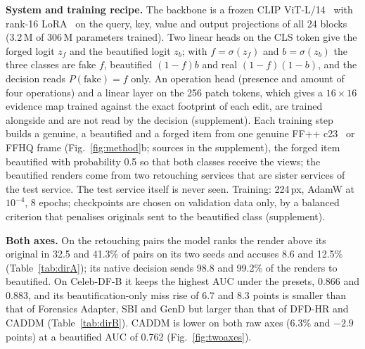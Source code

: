 \documentclass[journal]{IEEEtran}  %
\begin{document}
\textbf{System and training recipe.} The backbone is a frozen CLIP ViT-L/14~\cite{clip} with rank-16 LoRA~\cite{lora} on the
query, key, value and output projections of all 24 blocks (3.2\,M of 306\,M parameters trained). Two linear heads on the CLS
token give the forged logit $z_f$ and the beautified logit $z_b$; with $f=\sigma(z_f)$ and $b=\sigma(z_b)$ the three classes
are fake $f$, beautified $(1-f)b$ and real $(1-f)(1-b)$, and the decision reads $P(\text{fake})=f$ only. An operation head
(presence and amount of four operations) and a linear layer on the 256 patch tokens, which gives a $16\times16$ evidence map
trained against the exact footprint of each edit, are trained alongside and are not read by the decision (supplement).
Each training step builds a genuine, a beautified and a forged item from one genuine FF++ c23~\cite{ffpp} or FFHQ frame
(Fig.~\ref{fig:method}b; sources in the supplement), the forged item beautified with probability 0.5 so that both classes
receive the views; the beautified renders come from two retouching services that are sister services of the test service.
The test service itself is never seen. Training: 224\,px, AdamW at $10^{-4}$, 8 epochs; checkpoints are chosen on validation
data only, by a balanced criterion that penalises originals sent to the beautified class (supplement).


\textbf{Both axes.} On the retouching pairs the model ranks the render above its original in 32.5 and 41.3\% of pairs on
its two seeds and accuses 8.6 and 12.5\% (Table~\ref{tab:dirA}); its native decision sends 98.8 and 99.2\% of the renders to
beautified. On Celeb-DF-B it keeps the highest AUC under the presets, 0.866 and 0.883, and its beautification-only miss rise
of 6.7 and 8.3 points is smaller than that of Forensics Adapter, SBI and GenD but larger than that of DFD-HR and CADDM
(Table~\ref{tab:dirB}). CADDM is lower on both raw axes (6.3\% and $-2.9$ points) at a beautified AUC of 0.762
(Fig.~\ref{fig:twoaxes}).
\end{document}

